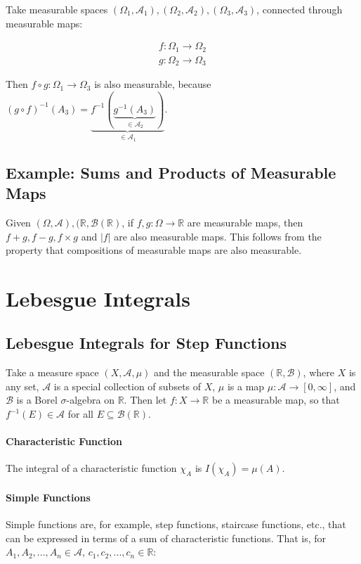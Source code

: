 Take measurable spaces $(\Omega_1,\mathscr{A}_1),(\Omega_2,\mathscr{A}_2),(\Omega_3,\mathscr{A}_3)$,  connected through measurable maps:

\begin{equation}
\begin{array}{l}
f: \Omega_1 \rightarrow \Omega_2 \\
g: \Omega_2 \rightarrow \Omega_3
\end{array}
\end{equation}

Then $f \circ g: \Omega_1 \rightarrow \Omega_3$ is also measurable, because $(g\circ f)^{-1}(A_3) = \underbrace{f^{-1}(\underbrace{g^{-1}(A_3)}_{\in \mathscr{A}_2})}_{\in \mathscr{A}_1}$.	 


\subsection{Example: Sums and Products of Measurable Maps}
Given $(\Omega,\mathscr{A}), (\mathbb{R},\mathscr{B}(\mathbb{R})$, if $f,g: \Omega \rightarrow \mathbb{R}$ 	are measurable maps, then $f+g, f-g, f\times g$ and $|f|$ are also measurable maps. This follows from the property that compositions of measurable maps are also measurable.



\section{Lebesgue Integrals}
\subsection{Lebesgue Integrals for Step Functions}
Take a measure space $(X,\mathscr{A}, \mu)$ and the measurable space $(\mathbb{R},\mathscr{B})$, where $X$ is any set, $\mathscr{A}$ is a special collection of subsets of $X$, $\mu$ is a map $\mu: \mathscr{A} \rightarrow [0,\infty]$, and $\mathscr{B}$ is a Borel $\sigma$-algebra on $\mathbb{R}$. Then let $f:X \rightarrow \mathbb{R}$ be a measurable map, so that $f^{-1}(E) \in \mathscr{A}$ for all $E\subseteq \mathscr{B}(\mathbb{R})$. 

\paragraph{Characteristic Function}
The integral of a characteristic function $\chi_A$ is $I(\chi_A) = \mu(A)$. 

\paragraph{Simple Functions}
Simple functions are, for example, step functions, staircase functions, etc., that can be expressed in terms of a sum of characteristic functions. That is, for $A_1,A_2,...,A_n\in\mathscr{A}$, $c_1,c_2,...,c_n\in\mathbb{R}$:

